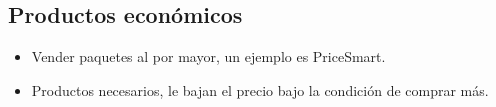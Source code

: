 \subsection{Productos económicos}
\begin{itemize}
    \item Vender paquetes al por mayor, un ejemplo es PriceSmart.
    \item Productos necesarios, le bajan el precio bajo la condición de comprar más.
\end{itemize}
